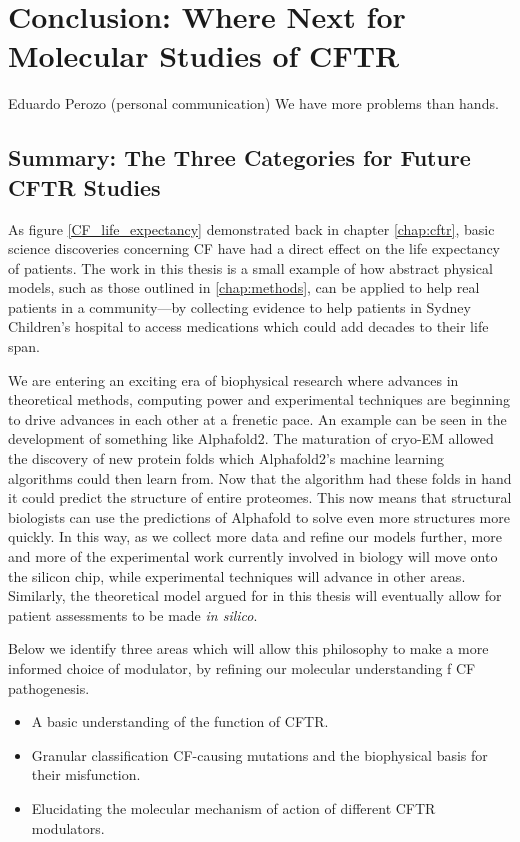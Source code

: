 \chapter{Conclusion: Where Next for Molecular Studies of CFTR}
\label{chap:conclusion}
\begin{chapquote} {Eduardo Perozo (personal communication)}
We have more problems than hands. 
\end{chapquote}


\section{Summary: The Three Categories for Future CFTR Studies}

As figure \ref{CF_life_expectancy} demonstrated back in chapter \ref{chap:cftr}, basic science discoveries concerning CF have had a direct effect on the life expectancy of patients. The work in this thesis is a small example of how abstract physical models, such as those outlined in \ref{chap:methods}, can be applied to help real patients in a community---by collecting evidence to help patients in Sydney Children's hospital to access medications which could add decades to their life span. 

We are entering an exciting era of biophysical research where advances in theoretical methods, computing power and experimental techniques are beginning to drive advances in each other at a frenetic pace. An example can be seen in the development of something like Alphafold2. The maturation of cryo-EM allowed the discovery of new protein folds which Alphafold2's machine learning algorithms could then learn from. Now that the algorithm had these folds in hand it could predict the structure of entire proteomes. This now means that structural biologists can use the predictions of Alphafold to solve even more structures more quickly. In this way, as we collect more data and refine our models further, more and more of the experimental work currently involved in biology will move onto the silicon chip, while experimental techniques will advance in other areas. Similarly, the theoretical model argued for in this thesis will eventually allow for patient assessments to be made \textit{in silico}.

Below we identify three areas which will allow this philosophy to make a more informed choice of modulator, by refining our molecular understanding f CF pathogenesis.

\begin{itemize}
	\item A basic understanding of the function of CFTR.
	\item Granular classification CF-causing mutations and the biophysical basis for their misfunction.
	\item Elucidating the molecular mechanism of action of different CFTR modulators. 
\end{itemize}

